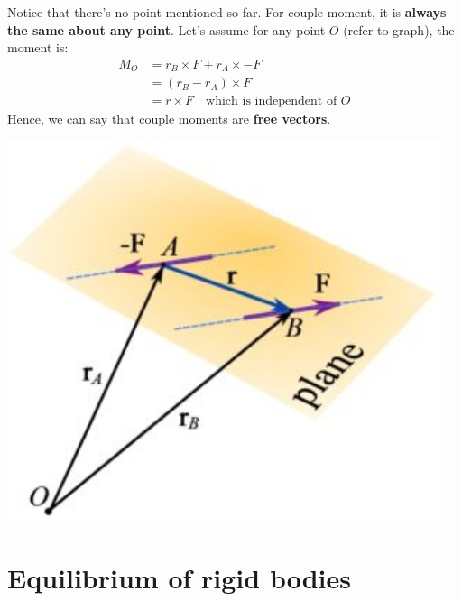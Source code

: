 \documentclass{article}
\begin{document}
\begin{minipage}{0.65\textwidth}
  Notice that there's no point mentioned so far. For couple moment, it is \textbf{always the same about any point}. Let's assume for any point $O$ (refer to graph), the moment is:
  \begin{align*}
    M_O & =r_B\times F+r_A\times -F \\&=(r_B-r_A)\times F\\&=r\times F\quad\text{which is independent of }O
  \end{align*}
  Hence, we can say that couple moments are \textbf{free vectors}.
\end{minipage}
\hfill
\begin{minipage}{0.3\textwidth}
  \includegraphics[width=0.95\textwidth]{img/Couple.jpg}
\end{minipage}

\section{Equilibrium of rigid bodies}
\end{document}
